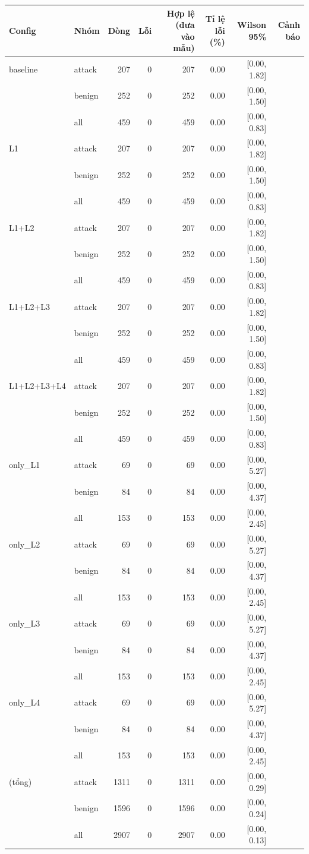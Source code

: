 \begin{tabular}{llrrrrrr}
\toprule
Config & Nhóm & Dòng & Lỗi & Hợp lệ (đưa vào mẫu) & Tỉ lệ lỗi (\%) & Wilson 95\% & Cảnh báo \\
\midrule
baseline & attack & 207 & 0 & 207 & 0.00 & [0.00, 1.82] &  \\
 & benign & 252 & 0 & 252 & 0.00 & [0.00, 1.50] &  \\
 & all & 459 & 0 & 459 & 0.00 & [0.00, 0.83] &  \\
\midrule
L1 & attack & 207 & 0 & 207 & 0.00 & [0.00, 1.82] &  \\
 & benign & 252 & 0 & 252 & 0.00 & [0.00, 1.50] &  \\
 & all & 459 & 0 & 459 & 0.00 & [0.00, 0.83] &  \\
\midrule
L1+L2 & attack & 207 & 0 & 207 & 0.00 & [0.00, 1.82] &  \\
 & benign & 252 & 0 & 252 & 0.00 & [0.00, 1.50] &  \\
 & all & 459 & 0 & 459 & 0.00 & [0.00, 0.83] &  \\
\midrule
L1+L2+L3 & attack & 207 & 0 & 207 & 0.00 & [0.00, 1.82] &  \\
 & benign & 252 & 0 & 252 & 0.00 & [0.00, 1.50] &  \\
 & all & 459 & 0 & 459 & 0.00 & [0.00, 0.83] &  \\
\midrule
L1+L2+L3+L4 & attack & 207 & 0 & 207 & 0.00 & [0.00, 1.82] &  \\
 & benign & 252 & 0 & 252 & 0.00 & [0.00, 1.50] &  \\
 & all & 459 & 0 & 459 & 0.00 & [0.00, 0.83] &  \\
\midrule
only\_L1 & attack & 69 & 0 & 69 & 0.00 & [0.00, 5.27] &  \\
 & benign & 84 & 0 & 84 & 0.00 & [0.00, 4.37] &  \\
 & all & 153 & 0 & 153 & 0.00 & [0.00, 2.45] &  \\
\midrule
only\_L2 & attack & 69 & 0 & 69 & 0.00 & [0.00, 5.27] &  \\
 & benign & 84 & 0 & 84 & 0.00 & [0.00, 4.37] &  \\
 & all & 153 & 0 & 153 & 0.00 & [0.00, 2.45] &  \\
\midrule
only\_L3 & attack & 69 & 0 & 69 & 0.00 & [0.00, 5.27] &  \\
 & benign & 84 & 0 & 84 & 0.00 & [0.00, 4.37] &  \\
 & all & 153 & 0 & 153 & 0.00 & [0.00, 2.45] &  \\
\midrule
only\_L4 & attack & 69 & 0 & 69 & 0.00 & [0.00, 5.27] &  \\
 & benign & 84 & 0 & 84 & 0.00 & [0.00, 4.37] &  \\
 & all & 153 & 0 & 153 & 0.00 & [0.00, 2.45] &  \\
\midrule
(tổng) & attack & 1311 & 0 & 1311 & 0.00 & [0.00, 0.29] &  \\
 & benign & 1596 & 0 & 1596 & 0.00 & [0.00, 0.24] &  \\
 & all & 2907 & 0 & 2907 & 0.00 & [0.00, 0.13] &  \\
\bottomrule
\end{tabular}
